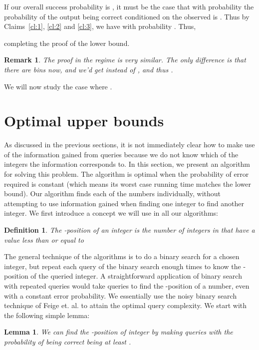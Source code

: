 \documentclass[12pt]{article}
\newtheorem{remark}[theorem]{Remark}
\newtheorem{mydef}[theorem]{Definition}
\newtheorem{lemma}[theorem]{Lemma}
\begin{document}
If our overall success probability is , it must be the case that with probability  the probability of the output  being correct conditioned 
on the observed  is . Thus by Claims~\ref{cl:1}, \ref{cl:2} and \ref{cl:3}, we have  with probability 
. Thus, 

completing the proof of the lower bound. 

\begin{remark}
The proof in the regime  is very similar. The only difference is that there are  bins now, and we'd get  instead 
of , and thus . 
\end{remark}

We will now study the case where .



\section{Optimal upper bounds} \label{sec:algorithm}

As discussed in the previous sections, it is not immediately clear how to make use of the information gained from queries because we do not know which of the  integers the information corresponds to. In this section, we present an algorithm for solving this problem. The algorithm is optimal when the probability of error required is constant (which means its worst case running time matches the lower bound). Our algorithm finds each of the  numbers individually, without attempting to use information gained when finding one integer to find another integer. We first introduce a concept we will use in all our algorithms: 
\begin{mydef}
The -position of an integer  is the number of integers in  that have a value less than or equal to 
\end{mydef}
The general technique of the algorithms is to do a binary search for a chosen integer, but repeat each query of the binary search enough times to know the -position of the queried integer. 
A straightforward application of binary search with repeated queries would take  queries to find the -position of a number, even with a constant error probability. 
We essentially use the noisy binary search technique of Feige et. al. \cite{Feige} to attain the optimal query complexity.  We start with the following simple lemma:

\begin{lemma} \label{lem:cointoss}
We can find the -position of integer  by making  queries with the probability of being correct being at least .
\end{lemma}
\end{document}
